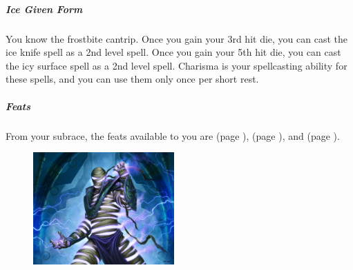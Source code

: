     \subparagraph{Ice Given Form} You know the frostbite cantrip.
    Once you gain your 3rd hit die, you can cast the ice knife spell as a 2nd level spell.
    Once you gain your 5th hit die, you can cast the icy surface spell as a 2nd level spell.
    Charisma is your spellcasting ability for these spells, and you can use them only once per short rest.

    \subparagraph{Feats} From your subrace, the feats available to you are
    \textbf{} (page \pageref{feat::}),
    \textbf{} (page \pageref{feat::}), and
    \textbf{} (page \pageref{feat::}).

\begin{figure}[!b]
    \centering
    \includegraphics[width=0.48\textwidth]{04kins/img/20zaloth_thunder.jpg}
\end{figure}

\newpage
